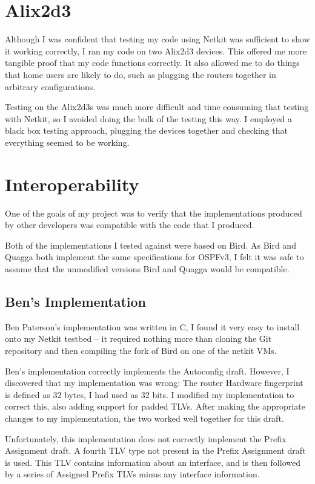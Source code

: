 \documentclass[12pt]{report}
\begin{document}
\section{Alix2d3}
Although I was confident that testing my code using Netkit was
sufficient to show it working correctly, I ran my code on two Alix2d3 devices.
This offered me more tangible proof that my code functions correctly. It also
allowed me to do things that home users are likely to do, such as plugging the
routers together in arbitrary configurations.

Testing on the Alix2d3s was much more difficult and time consuming that testing
with Netkit, so I avoided doing the bulk of the testing this way. I employed a
black box testing approach, plugging the devices together and checking that
everything seemed to be working. 

\section{Interoperability}
One of the goals of my project was to verify that the implementations produced
by other developers was compatible with the code that I produced. 

Both of the implementations I tested against were based on Bird. As Bird and
Quagga both implement the same specifications for OSPFv3, I felt it was safe to
assume that the unmodified versions Bird and Quagga would be compatible. 

\subsection{Ben's Implementation}
Ben Paterson's implementation was written in C, I found it very easy to install onto my
Netkit testbed -- it required nothing more than cloning the Git repository and
then compiling the fork of Bird on one of the netkit VMs. 

Ben's implementation correctly implements the Autoconfig draft. However, I
discovered that my implementation was wrong: The router Hardware fingerprint is
defined as 32 bytes, I had used as 32 bits. I modified my implementation to
correct this, also adding support for padded TLVs. After making the appropriate
changes to my implementation, the two worked well together for this draft.

Unfortunately, this implementation does not correctly implement the Prefix
Assignment draft. A fourth TLV type not present in the Prefix Assignment draft
is used. This TLV contains information about an interface, and is then followed
by a series of Assigned Prefix TLVs minus any interface information. 
\end{document}
